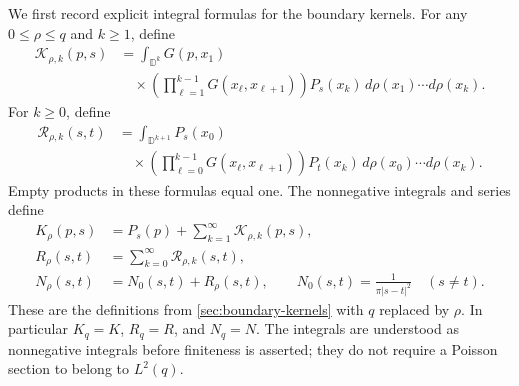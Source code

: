 We first record explicit integral formulas for the boundary kernels.
For any $0\le\rho\le q$ and $k\ge1$, define
\begin{equation}\label{eq:solution-iterated-integral}
 \begin{aligned}
 \mathcal K_{\rho,k}(p,s)
 &=\int_{\mathbb D^k}G(p,x_1)\\
 &\quad{}\times\left(\prod_{\ell=1}^{k-1}G(x_\ell,x_{\ell+1})\right)
 P_s(x_k)\,d\rho(x_1)\cdots d\rho(x_k).
 \end{aligned}
\end{equation}
For $k\ge0$, define
\begin{equation}\label{eq:interaction-iterated-integral}
 \begin{aligned}
 \mathcal R_{\rho,k}(s,t)
 &=\int_{\mathbb D^{k+1}}P_s(x_0)\\
 &\quad{}\times\left(\prod_{\ell=0}^{k-1}G(x_\ell,x_{\ell+1})\right)
 P_t(x_k)\,d\rho(x_0)\cdots d\rho(x_k).
 \end{aligned}
\end{equation}
Empty products in these formulas equal one. The nonnegative
integrals and series define
\begin{equation}\label{eq:potential-boundary-series}
 \begin{aligned}
 K_\rho(p,s)&=P_s(p)+\sum_{k=1}^\infty\mathcal K_{\rho,k}(p,s),\\
 R_\rho(s,t)&=\sum_{k=0}^\infty\mathcal R_{\rho,k}(s,t),\\
 N_\rho(s,t)&=N_0(s,t)+R_\rho(s,t),\qquad
 N_0(s,t)=\frac1{\pi|s-t|^2}\quad(s\ne t).
 \end{aligned}
\end{equation}
These are the definitions from \cref{sec:boundary-kernels} with $q$ replaced by $\rho$.
In particular $K_q=K$, $R_q=R$, and $N_q=N$. The integrals are
understood as nonnegative integrals before finiteness is asserted;
they do not require a Poisson section to belong to $L^2(q)$.

